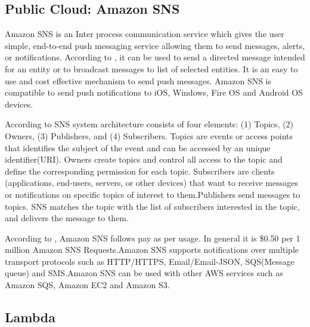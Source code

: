 \subsection{Public Cloud: Amazon SNS}

     Amazon SNS is an Inter process communication service which gives
     the user simple, end-to-end push messaging service allowing them
     to send messages, alerts, or notifications. According to
     \cite{www-sns-webpage}, it can be used to send a directed message
     intended for an entity or to broadcast messages to list of
     selected entities. It is an easy to use and cost effective
     mechanism to send push messages. Amazon SNS is compatible to send
     push notifications to iOS, Windows, Fire OS and Android OS
     devices.

     According to \cite{www-sns-blog} SNS system architecture consists 
     of four elements: (1) Topics, (2) Owners, (3) Publishers, and
     (4) Subscribers. Topics are events or access points that identifies
     the subject of the event and can be accessed by an unique
     identifier(URI). Owners create topics and control all access to
     the topic and define the corresponding permission for each
     topic. Subscribers are clients (applications, end-users,
     servers, or other devices) that want to receive messages or
     notifications on specific topics of interest to them.Publishers
     send messages to topics. SNS matches the topic with the list of
     subscribers interested in the topic, and delivers the message to
     them.

     According to \cite{www-sns-faq}, Amazon SNS follows pay as per
     usage. In general it is \$0.50 per 1 million Amazon SNS
     Requests.Amazon SNS supports notifications over multiple
     transport protocols such as HTTP/HTTPS, Email/Email-JSON,
     SQS(Message queue) and SMS.Amazon SNS can be used with other AWS
     services such as Amazon SQS, Amazon EC2 and Amazon S3.

\subsection{Lambda}

